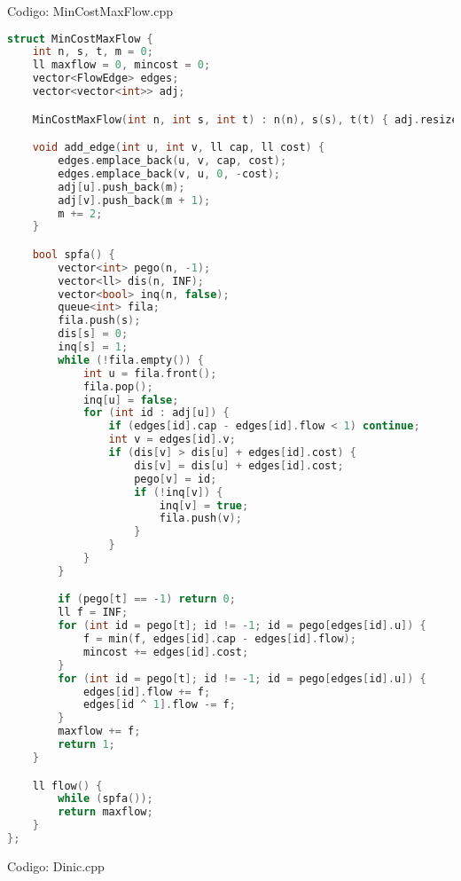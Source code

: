 \documentclass[10pt, a4paper, oneside]{book}
\begin{document}
Codigo: MinCostMaxFlow.cpp

\begin{lstlisting}[language=C++]
struct MinCostMaxFlow {
    int n, s, t, m = 0;
    ll maxflow = 0, mincost = 0;
    vector<FlowEdge> edges;
    vector<vector<int>> adj;

    MinCostMaxFlow(int n, int s, int t) : n(n), s(s), t(t) { adj.resize(n); }

    void add_edge(int u, int v, ll cap, ll cost) {
        edges.emplace_back(u, v, cap, cost);
        edges.emplace_back(v, u, 0, -cost);
        adj[u].push_back(m);
        adj[v].push_back(m + 1);
        m += 2;
    }

    bool spfa() {
        vector<int> pego(n, -1);
        vector<ll> dis(n, INF);
        vector<bool> inq(n, false);
        queue<int> fila;
        fila.push(s);
        dis[s] = 0;
        inq[s] = 1;
        while (!fila.empty()) {
            int u = fila.front();
            fila.pop();
            inq[u] = false;
            for (int id : adj[u]) {
                if (edges[id].cap - edges[id].flow < 1) continue;
                int v = edges[id].v;
                if (dis[v] > dis[u] + edges[id].cost) {
                    dis[v] = dis[u] + edges[id].cost;
                    pego[v] = id;
                    if (!inq[v]) {
                        inq[v] = true;
                        fila.push(v);
                    }
                }
            }
        }

        if (pego[t] == -1) return 0;
        ll f = INF;
        for (int id = pego[t]; id != -1; id = pego[edges[id].u]) {
            f = min(f, edges[id].cap - edges[id].flow);
            mincost += edges[id].cost;
        }
        for (int id = pego[t]; id != -1; id = pego[edges[id].u]) {
            edges[id].flow += f;
            edges[id ^ 1].flow -= f;
        }
        maxflow += f;
        return 1;
    }

    ll flow() {
        while (spfa());
        return maxflow;
    }
};
\end{lstlisting}
\hfill

Codigo: Dinic.cpp
\end{document}
